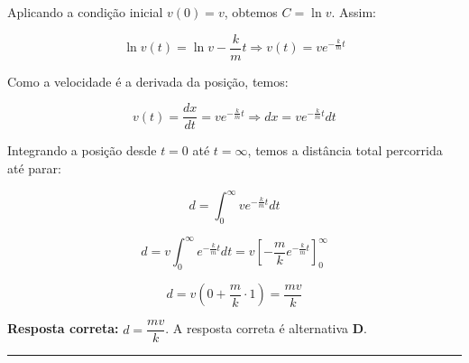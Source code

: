 \documentclass[a4paper,12pt]{article}
\begin{document}
\begin{flushleft}
Aplicando a condi\c{c}\~ao inicial \( v(0) = v \), obtemos \( C = \ln v \). Assim:

\[
\ln v(t) = \ln v - \frac{k}{m}t \Rightarrow v(t) = v e^{-\frac{k}{m}t}
\]

Como a velocidade \'e a derivada da posi\c{c}\~ao, temos:

\[
v(t) = \frac{dx}{dt} = v e^{-\frac{k}{m}t}
\Rightarrow dx = v e^{-\frac{k}{m}t} dt
\]

Integrando a posi\c{c}\~ao desde \( t = 0 \) at\'e \( t = \infty \), temos a dist\^ancia total percorrida at\'e parar:

\[
d = \int_0^{\infty} v e^{-\frac{k}{m}t} dt
\]

\[
d = v \int_0^{\infty} e^{-\frac{k}{m}t} dt = v \left[ -\frac{m}{k} e^{-\frac{k}{m}t} \right]_0^{\infty}
\]

\[
d = v \left( 0 + \frac{m}{k} \cdot 1 \right) = \frac{mv}{k}
\]

\textbf{Resposta correta:} \(\boxed{d = \dfrac{mv}{k}}\). A resposta correta é alternativa \colorbox{green!50}{\textbf{D}}.

\end{flushleft}

\noindent\rule{\linewidth}{0.6pt}\\
\end{document}
